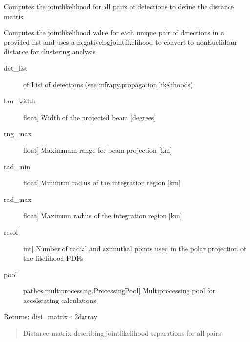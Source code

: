 \documentclass[letterpaper,10pt,english]{sphinxmanual}
\begin{document}
\begin{fulllineitems}
\label{\detokenize{infrapy.association:infrapy.association.hjl.build_distance_matrix}}
Computes the joint\sphinxhyphen{}likelihood for all pairs of detections to define the distance matrix

Computes the joint\sphinxhyphen{}likelihood value for each unique pair of detections in a provided list and
uses a negative\sphinxhyphen{}log\sphinxhyphen{}joint\sphinxhyphen{}likelihood to convert to non\sphinxhyphen{}Euclidean distance for clustering analysis
\begin{description}
\item[{det\_list}] \leavevmode{[} of \sphinxcode{\sphinxupquote{InfrasoundDetection}}{]}
List of detections (see infrapy.propagation.likelihoods)

\item[{bm\_width}] \leavevmode{[}float{]}
Width of the projected beam {[}degrees{]}

\item[{rng\_max}] \leavevmode{[}float{]}
Maximmum range for beam projection {[}km{]}

\item[{rad\_min}] \leavevmode{[}float{]}
Minimum radius of the integration region {[}km{]}

\item[{rad\_max}] \leavevmode{[}float{]}
Maximum radius of the integration region {[}km{]}

\item[{resol}] \leavevmode{[}int{]}
Number of radial and azimuthal points used in the polar projection of the likelihood PDFs

\item[{pool}] \leavevmode{[}pathos.multiprocessing.ProcessingPool{]}
Multiprocessing pool for accelerating calculations

\end{description}

Returns:
dist\_matrix : 2darray
\begin{quote}

Distance matrix describing joint\sphinxhyphen{}likelihood separations for all pairs
\end{quote}

\end{fulllineitems}
\end{document}
